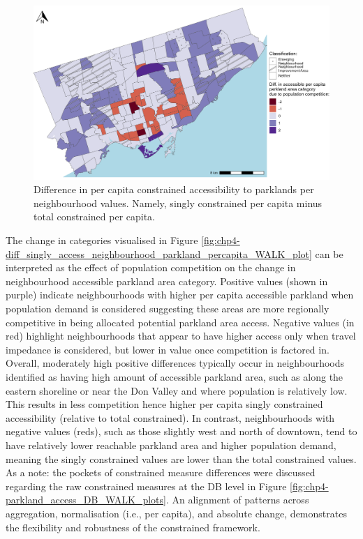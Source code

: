 \documentclass[
11pt, %
oneside, %
english, %
singlespacing, %
]{macthesis} %
\begin{document}
\begin{figure}

{\centering \includegraphics[width=6in]{./data/figures/chp4-diff_singly_access_neighbourhood_parkland_percapita_WALK_plot} 

}

\caption{\label{fig:chp4-diff_singly_access_neighbourhood_parkland_percapita_WALK_plot} Difference in per capita constrained accessibility to parklands per neighbourhood values. Namely, singly constrained per capita minus total constrained per capita. }\label{fig:unnamed-chunk-63}
\end{figure}

The change in categories visualised in Figure \ref{fig:chp4-diff_singly_access_neighbourhood_parkland_percapita_WALK_plot} can be interpreted as the effect of population competition on the change in neighbourhood accessible parkland area category. Positive values (shown in purple) indicate neighbourhoods with higher per capita accessible parkland when population demand is considered suggesting these areas are more regionally competitive in being allocated potential parkland area access. Negative values (in red) highlight neighbourhoods that appear to have higher access only when travel impedance is considered, but lower in value once competition is factored in. Overall, moderately high positive differences typically occur in neighbourhoods identified as having high amount of accessible parkland area, such as along the eastern shoreline or near the Don Valley and where population is relatively low. This results in less competition hence higher per capita singly constrained accessibility (relative to total constrained). In contrast, neighbourhoods with negative values (reds), such as those slightly west and north of downtown, tend to have relatively lower reachable parkland area and higher population demand, meaning the singly constrained values are lower than the total constrained values. As a note: the pockets of constrained measure differences were discussed regarding the raw constrained measures at the DB level in Figure \ref{fig:chp4-parkland_access_DB_WALK_plots}. An alignment of patterns across aggregation, normalisation (i.e., per capita), and absolute change, demonstrates the flexibility and robustness of the constrained framework.
\end{document}
